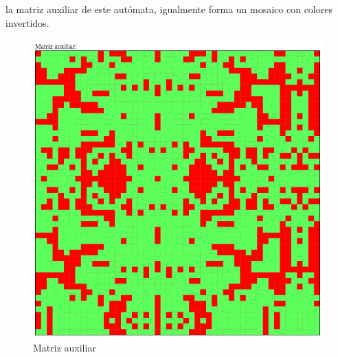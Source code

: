 	la matriz auxiliar de este autómata, igualmente forma un mosaico con colores invertidos.
	\begin{figure}[H]
		\begin{center}
			\includegraphics[scale=.3]{GOLM/img/regla3317-3-1.png}
			\caption{Matriz auxiliar}
			\label{fig:golm35}
		\end{center}
	\end{figure}

